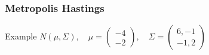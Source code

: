 \begin{frame}
\frametitle{Metropolis Hastings}
\begin{block}{Example}
$N(\mu, \Sigma), \quad \mu = \begin{pmatrix} -4 \\ -2
\end{pmatrix} , \quad \Sigma = \begin{pmatrix} 6,-1 \\ -1,2
\end{pmatrix}$
\end{block}
\end{frame}